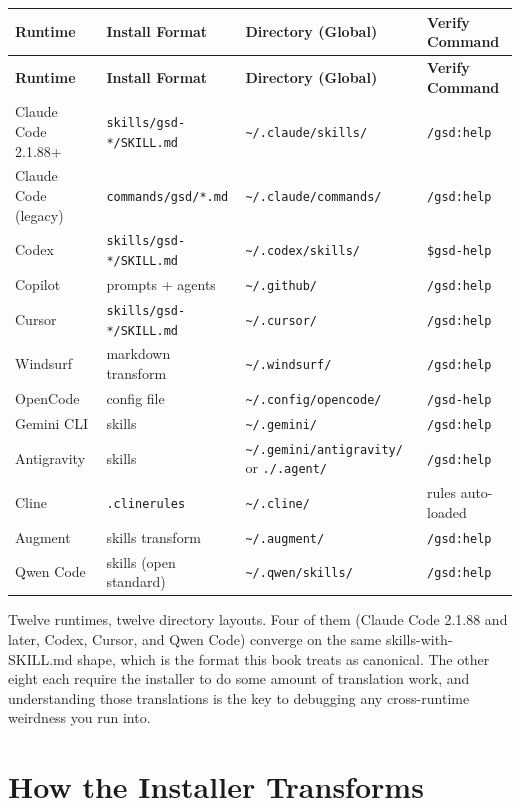 \documentclass[11pt,letterpaper,openany]{book}
\begin{document}
{\footnotesize
\begin{longtable}{@{}p{2.5cm} p{3.2cm} p{4.2cm} p{2.8cm}@{}}
\toprule
\textbf{Runtime} & \textbf{Install Format} & \textbf{Directory (Global)} & \textbf{Verify Command} \\
\midrule
\endfirsthead
\toprule
\textbf{Runtime} & \textbf{Install Format} & \textbf{Directory (Global)} & \textbf{Verify Command} \\
\midrule
\endhead
Claude Code 2.1.88+ & \texttt{skills/gsd-*/SKILL.md} & \texttt{\~{}/.claude/skills/} & \texttt{/gsd:help} \\
Claude Code (legacy) & \texttt{commands/gsd/*.md} & \texttt{\~{}/.claude/commands/} & \texttt{/gsd:help} \\
Codex & \texttt{skills/gsd-*/SKILL.md} & \texttt{\~{}/.codex/skills/} & \texttt{\$gsd-help} \\
Copilot & prompts + agents & \texttt{\~{}/.github/} & \texttt{/gsd:help} \\
Cursor & \texttt{skills/gsd-*/SKILL.md} & \texttt{\~{}/.cursor/} & \texttt{/gsd:help} \\
Windsurf & markdown transform & \texttt{\~{}/.windsurf/} & \texttt{/gsd:help} \\
OpenCode & config file & \texttt{\~{}/.config/opencode/} & \texttt{/gsd-help} \\
Gemini CLI & skills & \texttt{\~{}/.gemini/} & \texttt{/gsd:help} \\
Antigravity & skills & \texttt{\~{}/.gemini/antigravity/} or \texttt{./.agent/} & \texttt{/gsd:help} \\
Cline & \texttt{.clinerules} & \texttt{\~{}/.cline/} & rules auto-loaded \\
Augment & skills transform & \texttt{\~{}/.augment/} & \texttt{/gsd:help} \\
Qwen Code & skills (open standard) & \texttt{\~{}/.qwen/skills/} & \texttt{/gsd:help} \\
\bottomrule
\end{longtable}
}

Twelve runtimes, twelve directory layouts. Four of them (Claude Code 2.1.88
and later, Codex, Cursor, and Qwen Code) converge on the same skills-with-
SKILL.md shape, which is the format this book treats as canonical. The
other eight each require the installer to do some amount of translation
work, and understanding those translations is the key to debugging any
cross-runtime weirdness you run into.

\section{How the Installer Transforms}
\end{document}
